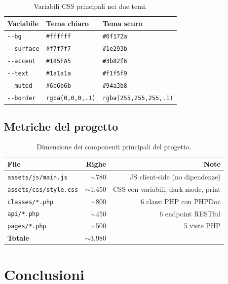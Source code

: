 \documentclass[12pt, a4paper]{article}
\begin{document}
\begin{table}[H]
\centering
\caption{Variabili CSS principali nei due temi.}
\renewcommand{\arraystretch}{1.3}
\begin{tabular}{lll}
\toprule
\textbf{Variabile} & \textbf{Tema chiaro} & \textbf{Tema scuro} \\
\midrule
\texttt{-{}-bg}      & \texttt{\#ffffff} & \texttt{\#0f172a} \\
\texttt{-{}-surface} & \texttt{\#f7f7f7} & \texttt{\#1e293b} \\
\texttt{-{}-accent}  & \texttt{\#185FA5} & \texttt{\#3b82f6} \\
\texttt{-{}-text}    & \texttt{\#1a1a1a} & \texttt{\#f1f5f9} \\
\texttt{-{}-muted}   & \texttt{\#6b6b6b} & \texttt{\#94a3b8} \\
\texttt{-{}-border}  & \texttt{rgba(0,0,0,.1)} & \texttt{rgba(255,255,255,.1)} \\
\bottomrule
\end{tabular}
\end{table}

\subsection{Metriche del progetto}

\begin{table}[H]
\centering
\caption{Dimensione dei componenti principali del progetto.}
\renewcommand{\arraystretch}{1.3}
\begin{tabular}{lrr}
\toprule
\textbf{File} & \textbf{Righe} & \textbf{Note} \\
\midrule
\texttt{assets/js/main.js}    & $\sim$780 & JS client-side (no dipendenze) \\
\texttt{assets/css/style.css} & $\sim$1{,}450 & CSS con variabili, dark mode, print \\
\texttt{classes/*.php}        & $\sim$800 & 6 classi PHP con PHPDoc \\
\texttt{api/*.php}            & $\sim$450 & 6 endpoint RESTful \\
\texttt{pages/*.php}          & $\sim$500 & 5 viste PHP \\
\midrule
\textbf{Totale}               & $\sim$3{,}980 & \\
\bottomrule
\end{tabular}
\end{table}

\section{Conclusioni}
\label{sec:conclusioni}
\end{document}
